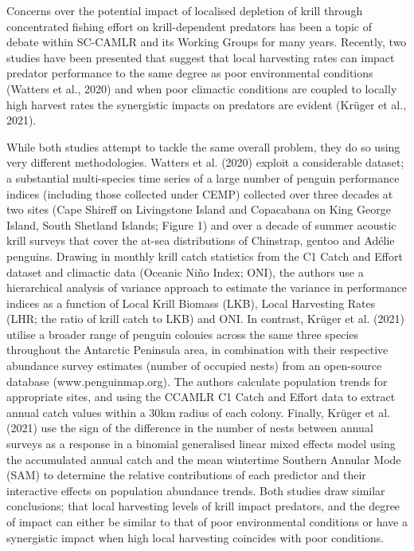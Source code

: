 \documentclass[]{elsarticle} %
\begin{document}
Concerns over the potential impact of localised depletion of krill
through concentrated fishing effort on krill-dependent predators has
been a topic of debate within SC-CAMLR and its Working Groups for many
years. Recently, two studies have been presented that suggest that local
harvesting rates can impact predator performance to the same degree as
poor environmental conditions (Watters et al., 2020) and when poor
climactic conditions are coupled to locally high harvest rates the
synergistic impacts on predators are evident (Krüger et al., 2021).

While both studies attempt to tackle the same overall problem, they do
so using very different methodologies. Watters et al. (2020) exploit a
considerable dataset; a substantial multi-species time series of a large
number of penguin performance indices (including those collected under
CEMP) collected over three decades at two sites (Cape Shireff on
Livingstone Island and Copacabana on King George Island, South Shetland
Islands; Figure 1) and over a decade of summer acoustic krill surveys
that cover the at-sea distributions of Chinstrap, gentoo and Adélie
penguins. Drawing in monthly krill catch statistics from the C1 Catch
and Effort dataset and climactic data (Oceanic Niño Index; ONI), the
authors use a hierarchical analysis of variance approach to estimate the
variance in performance indices as a function of Local Krill Biomass
(LKB), Local Harvesting Rates (LHR; the ratio of krill catch to LKB) and
ONI. In contrast, Krüger et al. (2021) utilise a broader range of
penguin colonies across the same three species throughout the Antarctic
Peninsula area, in combination with their respective abundance survey
estimates (number of occupied nests) from an open-source database
(www.penguinmap.org). The authors calculate population trends for
appropriate sites, and using the CCAMLR C1 Catch and Effort data to
extract annual catch values within a 30km radius of each colony.
Finally, Krüger et al. (2021) use the sign of the difference in the
number of nests between annual surveys as a response in a binomial
generalised linear mixed effects model using the accumulated annual
catch and the mean wintertime Southern Annular Mode (SAM) to determine
the relative contributions of each predictor and their interactive
effects on population abundance trends. Both studies draw similar
conclusions; that local harvesting levels of krill impact predators, and
the degree of impact can either be similar to that of poor environmental
conditions or have a synergistic impact when high local harvesting
coincides with poor conditions.
\end{document}
